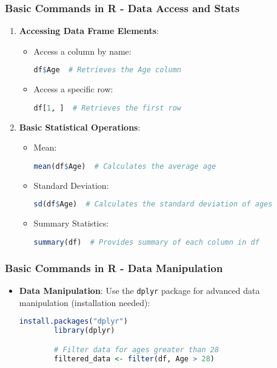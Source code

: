 \documentclass[aspectratio=169]{beamer}
\begin{document}
\begin{frame}[fragile]
    \frametitle{Basic Commands in R - Data Access and Stats}
    \begin{enumerate}[resume]
        \item \textbf{Accessing Data Frame Elements}:
        \begin{itemize}
            \item Access a column by name: 
            \begin{lstlisting}[language=R]
            df$Age  # Retrieves the Age column
            \end{lstlisting}
            \item Access a specific row: 
            \begin{lstlisting}[language=R]
            df[1, ]  # Retrieves the first row
            \end{lstlisting}
        \end{itemize}

        \item \textbf{Basic Statistical Operations}:
        \begin{itemize}
            \item Mean: 
            \begin{lstlisting}[language=R]
            mean(df$Age)  # Calculates the average age
            \end{lstlisting}
            \item Standard Deviation: 
            \begin{lstlisting}[language=R]
            sd(df$Age)  # Calculates the standard deviation of ages
            \end{lstlisting}
            \item Summary Statistics: 
            \begin{lstlisting}[language=R]
            summary(df)  # Provides summary of each column in df
            \end{lstlisting}
        \end{itemize}
    \end{enumerate}
\end{frame}

\begin{frame}[fragile]
    \frametitle{Basic Commands in R - Data Manipulation}
    \begin{itemize}
        \item \textbf{Data Manipulation}:
        Use the \texttt{dplyr} package for advanced data manipulation (installation needed):
        \begin{lstlisting}[language=R]
        install.packages("dplyr")
        library(dplyr)

        # Filter data for ages greater than 28
        filtered_data <- filter(df, Age > 28)
        \end{lstlisting}
    \end{itemize}
\end{frame}
\end{document}
